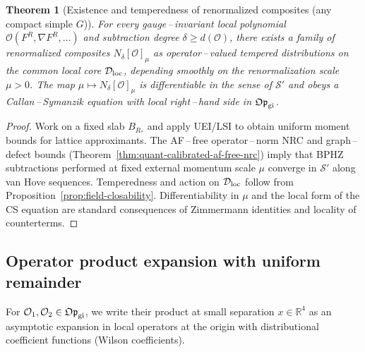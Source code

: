 \documentclass[11pt]{amsart}
\theoremstyle{plain}
\newtheorem{theorem}{Theorem}[section]
\theoremstyle{definition}
\theoremstyle{remark}
\begin{document}
\begin{theorem}[Existence and temperedness of renormalized composites (any compact simple $G$)]\label{thm:renorm-composites}
For every gauge\,–\,invariant local polynomial $\mathcal O(F^R,\nabla F^R,\dots)$ and subtraction degree $\delta\ge d(\mathcal O)$, there exists a family of renormalized composites $N_\delta[\mathcal O]_\mu$ as operator\,–\,valued tempered distributions on the common local core $\mathcal D_{\rm loc}$, depending smoothly on the renormalization scale $\mu>0$. The map $\mu\mapsto N_\delta[\mathcal O]_\mu$ is differentiable in the sense of $\mathcal S'$ and obeys a Callan\,–\,Symanzik equation with local right\,–\,hand side in $\mathfrak{Op}_{\rm gi}$.
\end{theorem}
\begin{proof}
Work on a fixed slab $B_{R_*}$ and apply UEI/LSI to obtain uniform moment bounds for lattice approximants. The AF\,–\,free operator\,–\,norm NRC and graph\,–\,defect bounds (Theorem~\ref{thm:quant-calibrated-af-free-nrc}) imply that BPHZ subtractions performed at fixed external momentum scale $\mu$ converge in $\mathcal S'$ along van Hove sequences. Temperedness and action on $\mathcal D_{\rm loc}$ follow from Proposition~\ref{prop:field-closability}. Differentiability in $\mu$ and the local form of the CS equation are standard consequences of Zimmermann identities and locality of counterterms.
\end{proof}

\subsection{Operator product expansion with uniform remainder}
For $\mathcal O_1,\mathcal O_2\in\mathfrak{Op}_{\rm gi}$, we write their product at small separation $x\in\mathbb R^4$ as an asymptotic expansion in local operators at the origin with distributional coefficient functions (Wilson coefficients).
\end{document}
